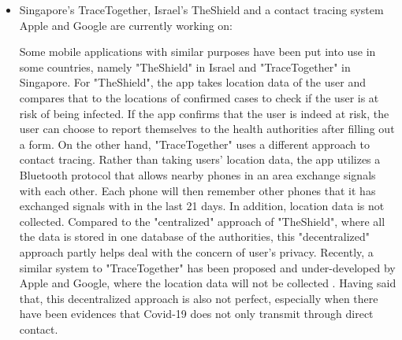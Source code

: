 \begin{itemize}
\begin{itemize}
          \item Singapore's TraceTogether, Israel's TheShield and a contact tracing system Apple and Google are currently working on:
          \par Some mobile applications with similar purposes have been put into use in some countries, namely "TheShield" in Israel \parencite{IsraelTheShield} and "TraceTogether" \parencite{SingTraceTogether} in Singapore. For "TheShield", the app takes location data of the user and compares that to the locations of confirmed cases to check if the user is at risk of being infected. If the app confirms that the user is indeed at risk, the user can choose to report themselves to the health authorities after filling out a form. On the other hand, "TraceTogether" uses a different approach to contact tracing. Rather than taking users' location data, the app utilizes a Bluetooth protocol that allows nearby phones in an area exchange signals with each other. Each phone will then remember other phones that it has exchanged signals with in the last 21 days. In addition, location data is not collected. Compared to the "centralized" approach of "TheShield", where all the data is stored in one database of the authorities, this "decentralized" approach partly helps deal with the concern of user's privacy. Recently, a similar system to "TraceTogether" has been proposed and under-developed by Apple and Google, where the location data will not be collected \parencite{AppleGoogleSys}. Having said that, this decentralized approach is also not perfect, especially when there have been evidences that Covid-19 does not only transmit through direct contact.


\end{itemize}
\end{itemize}
